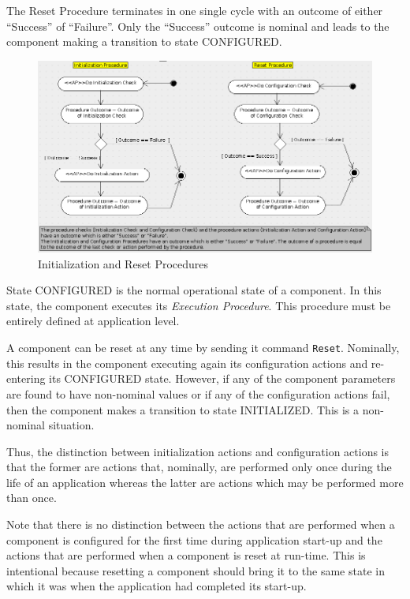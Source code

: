 \documentclass[a4paper,10pt]{article}
\begin{document}
The Reset Procedure terminates in one single cycle with an outcome of either “Success” of “Failure”. 
Only the “Success” outcome is nominal and leads to the component making a transition to state CONFIGURED.

\begin{figure}[ht]
 \centering
 \includegraphics[scale=0.3,keepaspectratio=true]{InitializationAndReset.png}
 \caption{Initialization and Reset Procedures}
 \label{fig:InitializationAndReset}
\end{figure}

State CONFIGURED is the normal operational state of a component. 
In this state, the component executes its \textit{Execution Procedure}. 
This procedure must be entirely defined at application level. 

A component can be reset at any time by sending it command \texttt{Reset}. 
Nominally, this results in the component executing again its configuration actions and re-entering its CONFIGURED state. 
However, if any of the component parameters are found to have non-nominal values or if any of the configuration actions fail, then the component makes a transition to state INITIALIZED. 
This is a non-nominal situation.

Thus, the distinction between initialization actions and configuration actions is that the former are actions that, nominally, are performed only once during the life of an application whereas the latter are actions which may be performed more than once.

Note that there is no distinction between the actions that are performed when a component is configured for the first time during application start-up and the actions that are performed when a component is reset at run-time. 
This is intentional because resetting a component should bring it to the same state in which it was when the application had completed its start-up.
\end{document}
